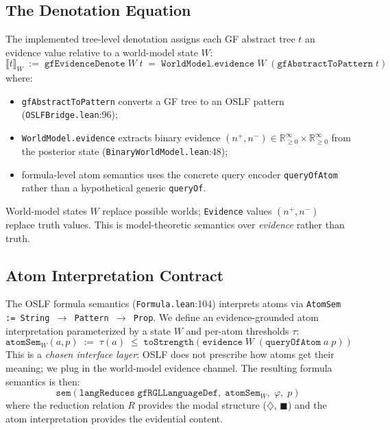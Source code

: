\documentclass[11pt]{article}
\newcommand{\code}[1]{\texttt{#1}}
\newcommand{\Dia}{\ensuremath{\diamondsuit}}
\newcommand{\Bx}{\ensuremath{\blacksquare}}
\newcommand{\OSLF}{\textup{OSLF}}
\newcommand{\GF}{\textup{GF}}
\begin{document}
\subsection{The Denotation Equation}

The implemented tree-level denotation assigns each \GF{} abstract tree $t$ an
evidence value relative to a world-model state $W$:
\begin{equation}
\label{eq:denote}
  \llbracket t \rrbracket_W
    \;:=\; \texttt{gfEvidenceDenote}\; W\; t
    \;=\; \texttt{WorldModel.evidence}\; W\;
           (\texttt{gfAbstractToPattern}\; t)
\end{equation}
where:
\begin{itemize}
\item \code{gfAbstractToPattern} converts a \GF{} tree to an \OSLF{}
  pattern (\code{OSLFBridge.lean}:96);
\item \code{WorldModel.evidence} extracts binary evidence $(n^+, n^-)
  \in \mathbb{R}_{\ge 0}^{\infty} \times \mathbb{R}_{\ge 0}^{\infty}$
  from the posterior state (\code{BinaryWorldModel.lean}:48);
\item formula-level atom semantics uses the concrete query encoder
  \code{queryOfAtom} rather than a hypothetical generic \code{queryOf}.
\end{itemize}
World-model states $W$ replace possible worlds; \code{Evidence} values
$(n^+, n^-)$ replace truth values.  This is model-theoretic semantics
over \emph{evidence} rather than truth.

\subsection{Atom Interpretation Contract}

The \OSLF{} formula semantics (\code{Formula.lean}:104) interprets atoms
via \code{AtomSem := String $\to$ Pattern $\to$ Prop}.  We define an
evidence-grounded atom interpretation parameterized by a state $W$ and
per-atom thresholds $\tau$:
\[
  \texttt{atomSem}_W(a, p)
    \;:=\;
    \tau(a) \;\le\; \texttt{toStrength}(\texttt{evidence}\; W\;
                      (\texttt{queryOfAtom}\; a\; p))
\]
This is a \emph{chosen interface layer}: \OSLF{} does not prescribe how
atoms get their meaning; we plug in the world-model evidence channel.
The resulting formula semantics is then:
\[
  \texttt{sem}(\texttt{langReduces}\; \texttt{gfRGLLanguageDef},\;
               \texttt{atomSem}_W,\; \varphi,\; p)
\]
where the reduction relation $R$ provides the modal structure ($\Dia$, $\Bx$)
and the atom interpretation provides the evidential content.
\end{document}
